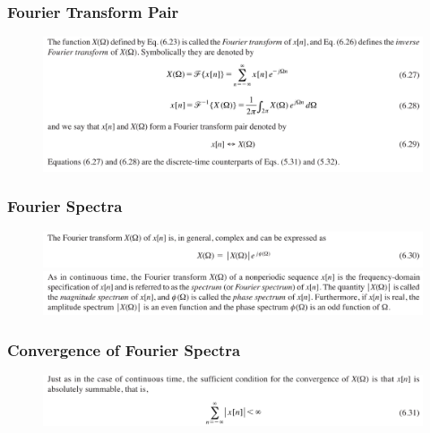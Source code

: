 \documentclass[pdflatex,compress,mathserif]{beamer}
\begin{document}
\begin{frame}
	\frametitle{Fourier Transform Pair}
	\begin{figure}
		\centering
		\includegraphics[width=\linewidth]{img/img08}
	\end{figure}
\end{frame}

\begin{frame}
	\frametitle{Fourier Spectra}
	\begin{figure}
		\centering
		\includegraphics[width=\linewidth]{img/img09}
		\includegraphics[width=\linewidth]{img/img10}
	\end{figure}
\end{frame}

\begin{frame}
	\frametitle{Convergence of Fourier Spectra}
	\begin{figure}
		\centering
		\includegraphics[width=\linewidth]{img/img11}
	\end{figure}
\end{frame}
\end{document}
